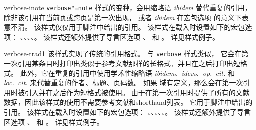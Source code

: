 \begin{marglist}
\item[verbose-inote]
\texttt{verbose"=note} 样式的变种，会用缩略语 \emph{ibidem} 替代重复的引用，
除非该引用在当前页或跨页是第一次出现，
或者 \emph{ibidem} 在宏包选项  的意义下表意不清。
该样式仅仅用于脚注中给出的引用。
该样式在载入时设置如下的宏包选项：
、、、、。
该样式还额外提供了导言区选项 、 和 。
详见样式例子。

\item[verbose-trad1]
该样式实现了传统的引用格式。
与 \texttt{verbose} 样式类似，
它会在第一次引用某条目时打印出类似于参考文献那样的长格式，并且在之后打印出短格式。
此外，它在重复的引用中使用学术性缩略语 \emph{ibidem}、\emph{idem}、\emph{op.~cit.} 和 \emph{loc.~cit.} 来代替重复的作者、标题、页码数。
如果  域有定义，那么会在第一次引用时被引入并在之后作为短格式被使用。
由于在第一次引用时提供了所有的文献数据，因此该样式的使用不需要参考文献和shorthand列表。
它用于脚注中给出的引用。
该样式在载入时设置如下的宏包选项：
、、、、、。
该样式还额外提供了导言区选项 、 和 。
详见样式例子。


\end{marglist}
